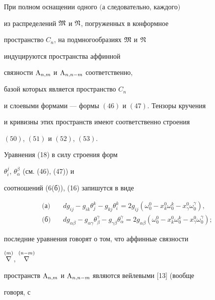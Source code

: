 \begin{thm} 


При полном оснащении одного $($а следовательно, каждого$)$ 


из распределений $\frak M$ и $\frak N$, погруженных в конформное 


пространство $C_n$, на подмногообразиях $\frak M$ и $\frak N$ 


индуцируются пространства аффинной 


связности $\mathrm{A}_{n,m}$ и $\mathrm{A}_{n,n-m}$ соответственно,


базой которых является пространство $C_n$ 


и слоевыми формами --- формы $(46)$ и $(47)$. Тензоры кручения 


и кривизны этих пространств имеют соответственно строения 


$(50)$, $(51)$ и $(52)$, $(53)$. 


\end{thm} 


 


Уравнения (18) в силу строения форм


$\theta^j_i$, $\theta^\beta_\alpha$ (см. (46), (47)) и 


соотношений (6(б)), (16) запишутся в виде 


\begin{align*} 


\text{(а)}\quad & d g_{ij}-g_{ik}\theta^k_j 


-g_{k j}\theta^k_i=2g_{ij}(\omega^0_0-x^0_k\omega^k_0- 


x^0_\gamma\omega^\gamma_0), \\ 


% 


\text{(б)}\quad & d g_{\alpha\beta}-g_{\alpha\gamma} 


\theta^\gamma_\beta-g_{\gamma\beta}\theta^\gamma_\alpha= 


2g_{\alpha\beta}(\omega^0_0-x^0_k\omega^k_0- 


x^0_\gamma\omega^\gamma_0); 


\end{align*} 


последние уравнения говорят о том, что аффинные связности 


$\overset{(m)}{\nabla}{}$, $\overset{(n-m)}{\nabla}{}$ 


пространств $\mathrm{A}_{n,m}$ и $\mathrm{A}_{n,n-m}$ являются вейлевыми [13] (вообще 


говоря, с 



